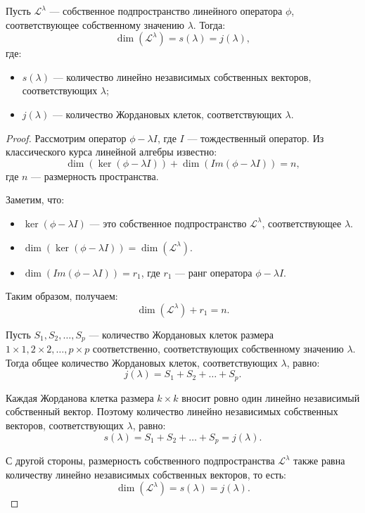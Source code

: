 \begin{shcor}
    \begin{corollary}
        Пусть $\mathcal{L}^{\lambda}$ — собственное подпространство линейного оператора $\phi$, соответствующее собственному значению $\lambda$. Тогда:
        \[
        \dim(\mathcal{L}^{\lambda}) = s(\lambda) = j(\lambda),
        \]
        где:
        \begin{itemize}
            \item $s(\lambda)$ — количество линейно независимых собственных векторов, соответствующих $\lambda$;
            \item $j(\lambda)$ — количество Жордановых клеток, соответствующих $\lambda$.
        \end{itemize}
    \end{corollary}
\end{shcor}

\begin{proof}
    Рассмотрим оператор $\phi - \lambda I$, где $I$ — тождественный оператор. Из классического курса линейной алгебры известно:
    \[
    \dim(\ker(\phi - \lambda I)) + \dim(Im(\phi - \lambda I)) = n,
    \]
    где $n$ — размерность пространства.

    Заметим, что:
    \begin{itemize}
        \item $\ker(\phi - \lambda I)$ — это собственное подпространство $\mathcal{L}^{\lambda}$, соответствующее $\lambda$.
        \item $\dim(\ker(\phi - \lambda I)) = \dim(\mathcal{L}^{\lambda})$.
        \item $\dim(Im(\phi - \lambda I)) = r_1$, где $r_1$ — ранг оператора $\phi - \lambda I$.
    \end{itemize}

    Таким образом, получаем:
    \[
    \dim(\mathcal{L}^{\lambda}) + r_1 = n.
    \]

    Пусть \( S_1, S_2, \ldots, S_p \) — количество Жордановых клеток размера \( 1 \times 1, 2 \times 2, \ldots, p \times p \) соответственно, соответствующих собственному значению \( \lambda \). Тогда общее количество Жордановых клеток, соответствующих \( \lambda \), равно:
    \[
    j(\lambda) = S_1 + S_2 + \ldots + S_p.
    \]

    Каждая Жорданова клетка размера \( k \times k \) вносит ровно один линейно независимый собственный вектор. Поэтому количество линейно независимых собственных векторов, соответствующих \( \lambda \), равно:
    \[
    s(\lambda) = S_1 + S_2 + \ldots + S_p = j(\lambda).
    \]

    С другой стороны, размерность собственного подпространства \( \mathcal{L}^{\lambda} \) также равна количеству линейно независимых собственных векторов, то есть:
    \[
    \dim(\mathcal{L}^{\lambda}) = s(\lambda) = j(\lambda).
    \]
\end{proof}

